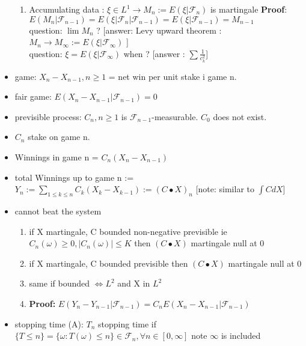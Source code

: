 \documentclass[10pt,landscape,a4paper]{article}
\newcommand{\myFF}{\mathcal{F}}
\begin{document}
\begin{multicols*}{3}
\begin{spacing}{0.5}
\begin{itemize}
\begin{enumerate}
\item  \colorbox{green!10} {Accumulating data : $\xi \in L^1 \rightarrow M_n := E(\xi|\myFF_n) $} is martingale \textbf{Proof}: $E(M_n|\myFF_{n-1}) = E(\xi|\myFF_n|\myFF_{n-1}) = E(\xi|\myFF_{n-1}) = M_{n-1} $ \\ \colorbox{red!10}{question}: $\lim M_n$  ? [answer: Levy upward theorem :$ M_n \rightarrow M_{\infty} := E(\xi|\myFF_{\infty})$ ]  \\ \colorbox{red!10}{question}: $\xi = E(\xi|\myFF_{\infty})$ when ? [answer : $\sum \frac{1}{c_k^2}$]

\end{enumerate}


\item game: $X_n-X_{n-1} , n \ge 1 $ = net win per unit stake i game n.

\item fair game: $E(X_n-X_{n-1} | \myFF_{n-1})=0$

\item previsible process: $C_n, n\ge 1$ is $\myFF_{n-1}$-measurable. $C_0$ does not exist.

\item $C_n$ stake on game n. 
\item  Winnings in  game n = $C_n(X_n-X_{n-1})$
\item  total Winnings up to game n := $Y_n := \sum_{1 \le k \le n}C_k(X_k-X_{k-1}) := {(C \bullet X)}_n$ [note: similar to $\int C dX$]

\item cannot beat the system
\begin{enumerate}

\item if X martingale, C bounded non-negative previsible ie $C_n(\omega) \ge 0, |C_n(\omega)| \le K $ then $(C \bullet X)$ martingale null at 0

\item if X martingale, C bounded previsible then $(C \bullet X)$ martingale null at 0

\item same if bounded $\Leftrightarrow L^2$ and X in $L^2$

\item \textbf{Proof:} $E(Y_n-Y_{n-1}|\myFF_{n-1}) = C_n E(X_n-X_{n-1}|\myFF_{n-1})$

\end{enumerate}

\item stopping time (A): $T_n$ stopping time if $ \{ T \le n \} = \{ \omega : T(\omega) \le n \} \in \myFF_{n}, \forall n \in [0,\infty]$ note $\infty$ is included


\end{itemize}
\end{spacing}
\end{multicols*}
\end{document}
